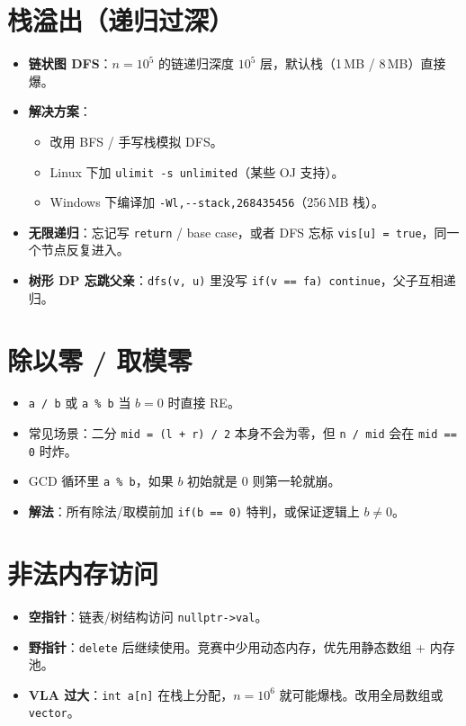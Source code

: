 \documentclass[UTF8,openany,oneside,zihao=-4]{ctexbook}
\begin{document}
\section{栈溢出（递归过深）}

\begin{warn}
\begin{itemize}
  \item \textbf{链状图 DFS}：$n = 10^5$ 的链递归深度 $10^5$ 层，默认栈（1\,MB / 8\,MB）直接爆。
  \item \textbf{解决方案}：
    \begin{itemize}
      \item 改用 BFS / 手写栈模拟 DFS。
      \item Linux 下加 \lstinline|ulimit -s unlimited|（某些 OJ 支持）。
      \item Windows 下编译加 \lstinline|-Wl,--stack,268435456|（256\,MB 栈）。
    \end{itemize}
  \item \textbf{无限递归}：忘记写 \lstinline|return| / base case，或者 DFS 忘标 \lstinline|vis[u] = true|，同一个节点反复进入。
  \item \textbf{树形 DP 忘跳父亲}：\lstinline|dfs(v, u)| 里没写 \lstinline|if(v == fa) continue|，父子互相递归。
\end{itemize}
\end{warn}

\section{除以零 / 取模零}

\begin{itemize}
  \item \lstinline|a / b| 或 \lstinline|a % b| 当 $b = 0$ 时直接 RE。
  \item 常见场景：二分 \lstinline|mid = (l + r) / 2| 本身不会为零，但 \lstinline|n / mid| 会在 \lstinline|mid == 0| 时炸。
  \item GCD 循环里 \lstinline|a % b|，如果 $b$ 初始就是 0 则第一轮就崩。
  \item \textbf{解法}：所有除法/取模前加 \lstinline|if(b == 0)| 特判，或保证逻辑上 $b \ne 0$。
\end{itemize}

\section{非法内存访问}

\begin{itemize}
  \item \textbf{空指针}：链表/树结构访问 \lstinline|nullptr->val|。
  \item \textbf{野指针}：\lstinline|delete| 后继续使用。竞赛中少用动态内存，优先用静态数组 + 内存池。
  \item \textbf{VLA 过大}：\lstinline|int a[n]| 在栈上分配，$n = 10^6$ 就可能爆栈。改用全局数组或 \lstinline|vector|。
\end{itemize}
\end{document}
